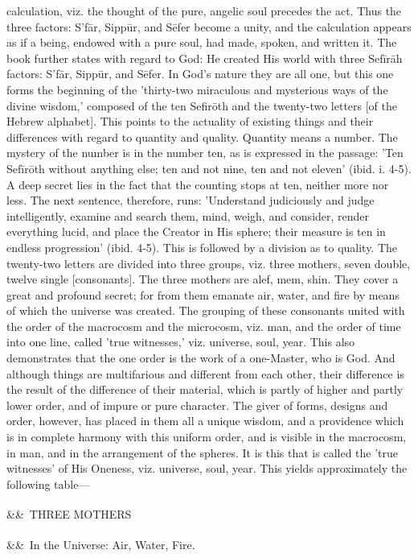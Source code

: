 \documentclass[12pt]{article}
\newcommand{\para}[1][]{\par\noindent\ifx&#1&\else\textsuperscript{\footnotesize #1}~\fi}
\begin{document}
calculation, viz. the thought of the pure, angelic soul precedes the act. Thus the three factors: S’fār, Sippūr, and Sēfer become a unity, and the calculation appears as if a being, endowed with a pure soul, had made, spoken, and written it. The book further states with regard to God: He created His world with three Sefīrāh factors: S’fār, Sippūr, and Sēfer. In God's nature they are all one, but this one forms the beginning of the 'thirty-two miraculous and mysterious ways of the divine wisdom,' composed of the ten Sefirōth and the twenty-two letters [of the Hebrew alphabet]. This points to the actuality of existing things and their differences with regard to quantity and quality. Quantity means a number. The mystery of the number is in the number ten, as is expressed in the passage: 'Ten Sefīrōth without anything else; ten and not nine, ten and not eleven' (ibid. i. 4-5). A deep secret lies in the fact that the counting stops at ten, neither more nor less. The next sentence, therefore, runs: 'Understand judiciously and judge intelligently, examine and search them, mind, weigh, and consider, render everything lucid, and place the Creator in His sphere; their measure is ten in endless progression' (ibid. 4-5). This is followed by a division as to quality. The twenty-two letters are divided into three groups, viz. three mothers, seven double, twelve single [consonants]. The three mothers are alef, mem, shin. They cover a great and profound secret; for from them emanate air, water, and fire by means of which the universe was created. The grouping of these consonants united with the order of the macrocosm and the microcosm, viz. man, and the order of time into one line, called 'true witnesses,' viz. universe, soul, year. This also demonstrates that the one order is the work of a one-Master, who is God. And although things are multifarious and different from each other, their difference is the result of the difference of their material, which is partly of higher and partly lower order, and of impure or pure character. The giver of forms, designs and order, however, has placed in them all a unique wisdom, and a providence which is in complete harmony with this uniform order, and is visible in the macrocosm, in man, and in the arrangement of the spheres. It is this that is called the 'true witnesses' of His Oneness, viz. universe, soul, year. This yields approximately the following table---

\para THREE MOTHERS

\para In the Universe: Air, Water, Fire.
\end{document}
